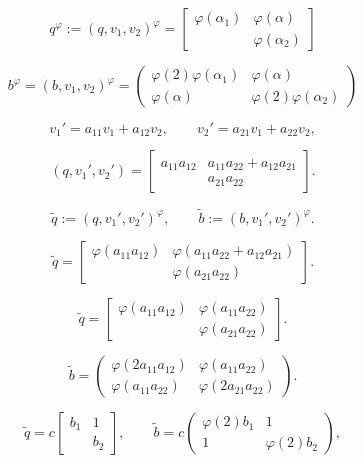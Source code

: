 \documentclass{article}
\begin{document}
\begin{equation}\label{eq:II.8.2}
q^{\varphi}:=(q,v_1,v_2)^{\varphi}=\begin{bmatrix}{\varphi}({\alpha}_1) & {\varphi}({\alpha})\\  & {\varphi}({\alpha}_2)\end{bmatrix} \end{equation}

\begin{equation}\label{eq:II.8.3}
 b^{\varphi}=(b,v_1,v_2)^{\varphi}=\begin{pmatrix} {\varphi}(2){\varphi}({\alpha}_1) & {\varphi}({\alpha})\\ {\varphi}({\alpha}) &{\varphi}(2){\varphi}({\alpha}_2)\end{pmatrix}\end{equation}

$$v_1'=a_{11}v_1+a_{12}v_2,\qquad v_2'=a_{21}v_1+a_{22}v_2,$$

$$(q,v_1',v_2')=\begin{bmatrix} a_{11}a_{12} & a_{11}a_{22}+a_{12}a_{21}\\
 & a_{21}a_{22}\end{bmatrix}.$$

$${\tilde q}:=(q,v_1',v_2')^{\varphi},\qquad {\tilde b}:=(b,v_1',v_2')^{\varphi}.$$

\begin{equation}\label{eq:II.8.4}
{\tilde q}=\begin{bmatrix} {\varphi}(a_{11}a_{12})& {\varphi}(a_{11}a_{22}+a_{12}a_{21})\\  & {\varphi}(a_{21}a_{22})\end{bmatrix}.
\end{equation}

$${\tilde q}=\begin{bmatrix} {\varphi}(a_{11}a_{12}) & {\varphi}(a_{11}a_{22})\\  & {\varphi}(a_{21}a_{22})\end{bmatrix}.$$

$${\tilde b}=\begin{pmatrix} {\varphi}(2a_{11}a_{12}) & {\varphi}(a_{11}a_{22})\\
{\varphi}(a_{11}a_{22})& {\varphi}(2a_{21}a_{22})\end{pmatrix}.$$

$${\tilde q}=c\begin{bmatrix} b_1 &1\\  & b_2\end{bmatrix},\qquad {\tilde b}=c\begin{pmatrix}{\varphi}(2)b_1 & 1\\ 1 & {\varphi}(2)b_2\end{pmatrix},$$
\end{document}
